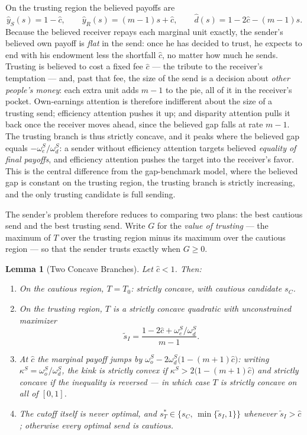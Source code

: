 \documentclass[11pt]{article}
\theoremstyle{plain}
\newtheorem{lemma}{Lemma}
\theoremstyle{remark}
\begin{document}
On the trusting region the believed payoffs are
\[
        \hat y_S(s)=1-\hat c,
        \qquad
        \hat y_R(s)=(m-1)s+\hat c,
        \qquad
        \hat d(s)=1-2\hat c-(m-1)s .
\]
Because the believed receiver repays each marginal unit exactly, the sender's believed own payoff is \emph{flat} in the send: once he has decided to trust, he expects to end with his endowment less the shortfall $\hat c$, no matter how much he sends.  Trusting is believed to cost a fixed fee $\hat c$ --- the tribute to the receiver's temptation --- and, past that fee, the size of the send is a decision about \emph{other people's money}: each extra unit adds $m-1$ to the pie, all of it in the receiver's pocket.  Own-earnings attention is therefore indifferent about the size of a trusting send; efficiency attention pushes it up; and disparity attention pulls it back once the receiver moves ahead, since the believed gap falls at rate $m-1$.  The trusting branch is thus strictly concave, and it peaks where the believed gap equals $-\omega_e^S/\omega_d^S$: a sender without efficiency attention targets believed \emph{equality of final payoffs}, and efficiency attention pushes the target into the receiver's favor.  This is the central difference from the gap-benchmark model, where the believed gap is constant on the trusting region, the trusting branch is strictly increasing, and the only trusting candidate is full sending.

The sender's problem therefore reduces to comparing two plans: the best cautious send and the best trusting send.  Write $G$ for the \emph{value of trusting} --- the maximum of $T$ over the trusting region minus its maximum over the cautious region --- so that the sender trusts exactly when $G\ge0$.

\begin{lemma}[Two Concave Branches]
\label{lem:norm2_twobranch}
Let $\hat c<1$.  Then:
\begin{enumerate}[topsep=2pt,itemsep=2pt]
\item On the cautious region, $T=T_0$: strictly concave, with cautious candidate $s_C$.
\item On the trusting region, $T$ is a strictly concave quadratic with unconstrained maximizer
\[
        \tilde s_I=\frac{1-2\hat c+\omega_e^S/\omega_d^S}{m-1}.
\]
\item At $\hat c$ the marginal payoff jumps by $\omega_o^S-2\omega_d^S\big(1-(m+1)\hat c\big)$: writing $\kappa^S=\omega_o^S/\omega_d^S$, the kink is strictly convex if $\kappa^S>2\big(1-(m+1)\hat c\big)$ and strictly concave if the inequality is reversed --- in which case $T$ is strictly concave on all of $[0,1]$.
\item The cutoff itself is never optimal, and $s_T^\ast\in\{s_C,\,\min\{\tilde s_I,1\}\}$ whenever $\tilde s_I>\hat c$; otherwise every optimal send is cautious.
\end{enumerate}
\end{lemma}
\end{document}
